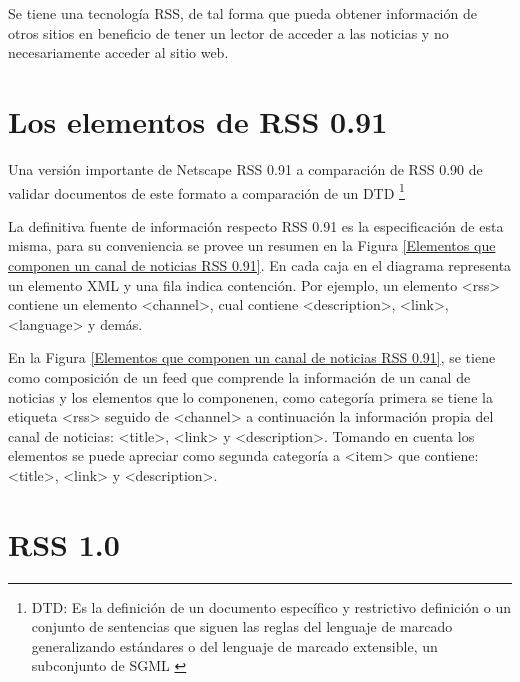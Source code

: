Se tiene una tecnolog\'{i}a RSS, de tal forma que pueda obtener informaci\'{o}n de
otros sitios en beneficio de tener un lector de acceder a las noticias y no necesariamente
acceder al sitio web.

\section{Los elementos de RSS 0.91}

Una versi\'{o}n importante de Netscape RSS 0.91 a comparaci\'{o}n de RSS 0.90 
de validar documentos de este formato a comparaci\'{o}n de un DTD 
\footnote{DTD: Es la definici\'{o}n de un documento espec\'{i}fico y 
restrictivo definici\'{o}n o un conjunto de sentencias que siguen las reglas 
del lenguaje de marcado generalizando est\'{a}ndares o del lenguaje de marcado
extensible, un subconjunto de SGML \cite{dtd}} 

La definitiva fuente de informaci\'{o}n respecto RSS 0.91 es la especificaci\'{o}n de
esta misma, para su conveniencia se provee un resumen en la Figura \ref{Elementos
que componen un canal de noticias RSS 0.91}. En cada caja en el diagrama
representa un elemento XML y una fila indica contenci\'{o}n. Por ejemplo, un elemento
<rss> contiene un elemento <channel>, cual contiene <description>, <link>, <language> y dem\'{a}s.
\cite{johnson2006rss}

En la Figura \ref{Elementos que componen un canal de noticias RSS 0.91}, se tiene como
composici\'{o}n de un feed que comprende la informaci\'{o}n de un canal de noticias y
los elementos que lo componenen, como categor\'{i}a primera se tiene la etiqueta <rss>
seguido de <channel> a continuaci\'{o}n la informaci\'{o}n propia del canal de noticias:
<title>, <link> y <description>. Tomando en cuenta los elementos se puede apreciar como
segunda categor\'{i}a a <item> que contiene: <title>, <link> y <description>.   

\begin{minipage}{1.0\textwidth}
	\centering
	\label{Elementos que componen un canal de noticias RSS 0.91}
\end{minipage}


\section{RSS 1.0}

